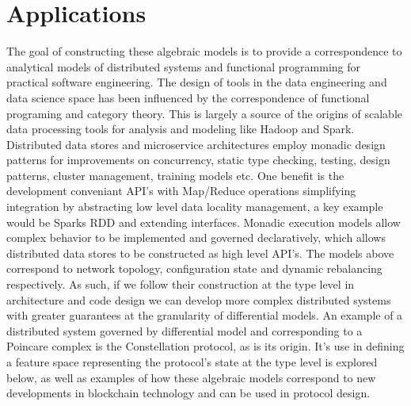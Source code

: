 \documentclass{article}
\begin{document}
\section{Applications} 
The goal of constructing these algebraic models is to provide a correspondence to analytical models of distributed systems and functional programming for practical software engineering. The design of tools in the data engineering and data science space has been influenced by the correspondence of functional programing and category theory. This is largely a source of the origins of scalable data processing tools for analysis and modeling like Hadoop and Spark. Distributed data stores and microservice architectures employ monadic design patterns for improvements on concurrency, static type checking, testing, design patterns, cluster management, training models etc. One benefit is the development conveniant API's with Map/Reduce operations simplifying integration by abstracting low level data locality management, a key example would be Sparks RDD and extending interfaces. Monadic execution models allow complex behavior to be implemented and governed declaratively, which allows distributed data stores to be constructed as high level API's. The models above correspond to network topology, configuration state and dynamic rebalancing respectively. As such, if we follow their construction at the type level in architecture and code design we can develop more complex distributed systems with greater guarantees at the granularity of differential models. An example of a distributed system governed by differential model and corresponding to a Poincare complex is the Constellation protocol, as is its origin. It's use in defining a feature space representing the protocol's state at the type level is explored below, as well as examples of how these algebraic models correspond to new developments in blockchain technology and can be used in protocol design.
\end{document}
